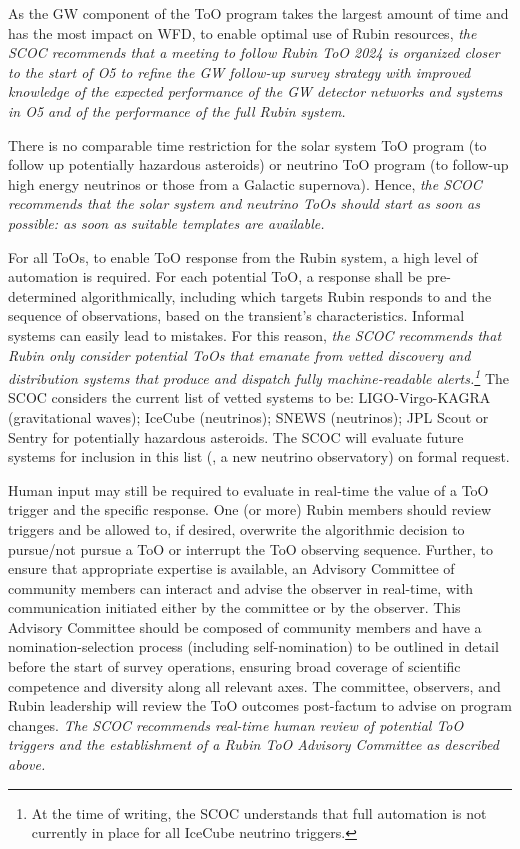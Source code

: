 As the GW component of the ToO program takes the largest amount of time and has the most impact on WFD, to enable optimal use of Rubin resources, {\it the SCOC recommends that a meeting to follow Rubin ToO 2024 is organized closer to the start of O5 to refine the GW follow-up survey strategy with improved knowledge of the expected performance of the GW detector networks and systems in O5 and of the performance of the full Rubin system.}
%

There is no comparable time restriction for the solar system ToO program (to follow up potentially hazardous asteroids) or neutrino ToO program (to follow-up high energy neutrinos or those from a Galactic supernova). Hence, {\it the SCOC recommends that the solar system and neutrino ToOs should start as soon as possible: as soon as suitable templates are available.} 



For all ToOs, to enable ToO response from the Rubin system, a high level of automation is required. For each potential ToO, a response shall be pre-determined algorithmically, including which targets Rubin responds to and the sequence of observations, based on the transient’s characteristics. Informal systems can easily lead to mistakes. For this reason, {\it the SCOC recommends that Rubin only consider potential ToOs that emanate from vetted discovery and distribution systems that produce and dispatch fully machine-readable alerts.\footnote{At the time of writing, the SCOC understands that full automation is not currently in place for all IceCube neutrino triggers.}} The SCOC considers the current list of vetted systems to be: LIGO-Virgo-KAGRA (gravitational waves); IceCube (neutrinos); SNEWS (neutrinos); JPL Scout or Sentry for potentially hazardous asteroids. The SCOC will evaluate future systems for inclusion in this list (\eg , a new neutrino observatory) on formal request.

Human input may still be required to evaluate in real-time the value of a ToO trigger and the specific response. One (or more) Rubin members %
should review triggers and be allowed to, if desired, overwrite the algorithmic decision to pursue/not pursue a ToO or interrupt the ToO observing sequence. Further, to ensure that appropriate expertise is available, an Advisory Committee of community members can interact and advise the observer in real-time, with communication initiated either by the committee or by the observer. 
This Advisory Committee should be composed of community members and have a nomination-selection process (including self-nomination) to be outlined in detail before the start of survey operations, ensuring broad coverage of scientific competence and diversity along all relevant axes.
The committee, observers, and Rubin leadership will review the ToO outcomes post-factum to advise on program changes. 
{\it The SCOC recommends real-time human review of potential ToO triggers and the establishment of a Rubin ToO Advisory Committee as described above.}



